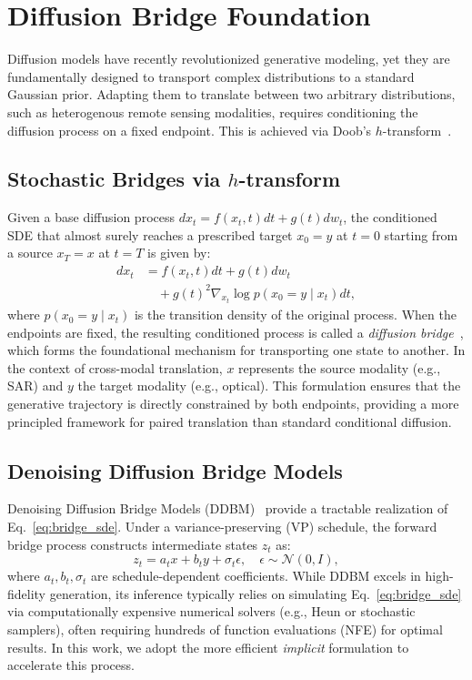 \section{Diffusion Bridge Foundation}
\label{sec:background}

Diffusion models have recently revolutionized generative modeling, yet they are fundamentally designed to transport complex distributions to a standard Gaussian prior. Adapting them to translate between two arbitrary distributions, such as heterogenous remote sensing modalities, requires conditioning the diffusion process on a fixed endpoint. This is achieved via Doob's $h$-transform~\cite{doob1984classical,rogers2000diffusions}.

\subsection{Stochastic Bridges via \texorpdfstring{$h$}{h}-transform}
Given a base diffusion process $dx_t = f(x_t, t)dt + g(t)dw_t$, the conditioned SDE that almost surely reaches a prescribed target $x_0 = y$ at $t=0$ starting from a source $x_T = x$ at $t=T$ is given by:
\begin{align}
    dx_t &= f(x_t, t)dt + g(t)dw_t \nonumber \\
    &\quad + g(t)^2 \nabla_{x_t} \log p(x_0 = y \mid x_t)dt,
    \label{eq:bridge_sde}
\end{align}
where $p(x_0 = y \mid x_t)$ is the transition density of the original process. When the endpoints are fixed, the resulting conditioned process is called a \emph{diffusion bridge}~\cite{sarkka2019applied,heng2021simulating,delyon2006simulation,schauer2017guided,peluchettinon,liu2022let}, which forms the foundational mechanism for transporting one state to another. In the context of cross-modal translation, $x$ represents the source modality (e.g., SAR) and $y$ the target modality (e.g., optical). This formulation ensures that the generative trajectory is directly constrained by both endpoints, providing a more principled framework for paired translation than standard conditional diffusion.

\subsection{Denoising Diffusion Bridge Models}
Denoising Diffusion Bridge Models (DDBM)~\cite{zhouDenoisingDiffusionBridge2024} provide a tractable realization of Eq.~\ref{eq:bridge_sde}. Under a variance-preserving (VP) schedule, the forward bridge process constructs intermediate states $z_t$ as:
\begin{equation}
    z_t = a_t x + b_t y + \sigma_t \epsilon, \quad \epsilon \sim \mathcal{N}(0, I),
    \label{eq:bridge_forward}
\end{equation}
where $a_t, b_t, \sigma_t$ are schedule-dependent coefficients. While DDBM excels in high-fidelity generation, its inference typically relies on simulating Eq.~\ref{eq:bridge_sde} via computationally expensive numerical solvers (e.g., Heun or stochastic samplers), often requiring hundreds of function evaluations (NFE) for optimal results. In this work, we adopt the more efficient \emph{implicit} formulation to accelerate this process.
